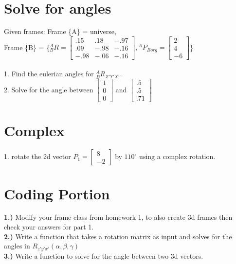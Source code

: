 \documentclass{article}
\begin{document}
\section{Solve for angles}
Given frames: Frame \{A\} = universe,\\ 
Frame \{B\} = \{${}^{A}_{B}R=\begin{bmatrix}
.15 & .18 & -.97\\
.09 & -.98 & -.16 \\
-.98 & -.06 & -.16
\end{bmatrix} ,{}^{A}P_{Borg}=\begin{bmatrix}
2  \\
4  \\
-6
\end{bmatrix} $\}\\\\
1. Find the eulerian angles for ${}^{A}_{B}R_{Z'Y'X'}$.\\
2. Solve for the angle between $\begin{bmatrix}
1\\
0\\
0
\end{bmatrix}$ and $\begin{bmatrix}
.5 \\
.5\\
.71
\end{bmatrix}$


\section{Complex}
1. rotate the 2d vector $P_{1}=\begin{bmatrix}
8  \\
-2 
\end{bmatrix}$ by $110^{\circ}$ using a complex rotation. \\

\section{Coding Portion}
\textbf{1.) } Modify your frame class from homework 1, to also create 3d frames then check your answers for part 1.\\
\textbf{2.) } Write a function that takes a rotation matrix as input and solves for the angles in $R_{z'y'x'}(\alpha,\beta,\gamma)$\\
\textbf{3.) } Write a function to solve for the angle between two 3d vectors.\\
\end{document}
